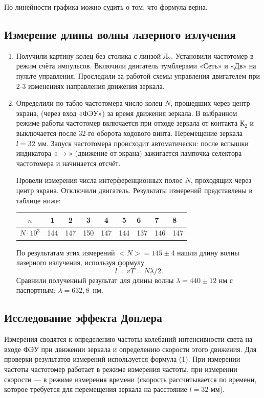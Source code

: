 \documentclass[a4paper,12pt]{article}
\begin{document}
 По линейности графика можно судить о том, что формула верна.
 \subsection*{Измерение длины волны лазерного излучения}
 \begin{enumerate}
 	\item Получили картину колец без столика с линзой Л$_2$. Установили частотомер в режим счёта импульсов. Включили двигатель тумблерами «Сеть» и «Дв» на пульте управления. Проследили за работой схемы управления двигателем при 2-3 изменениях направления движения зеркала.
 	\item Определили по табло частотомера число колец $N$, прошедших через центр экрана, (через вход «ФЭУ») за время движения зеркала. В выбранном режиме работы частотомер включается при отходе зеркала от контакта К$_2$ и выключается после 32-го оборота ходового винта. Перемещение зеркала $l = 32$ мм. Запуск частотомера происходит автоматически: после вспышки индикатора «$\rightarrow$» (движение от экрана) зажигается лампочка селектора частотомера и начинается отсчёт.
 	
 	Провели измерения числа интерференционных полос $N$, проходящих через центр экрана. Отключили двигатель. Результаты измерений представлены в таблице ниже:
 	\begin{center}
 		\begin{tabular}{|c|c|c|c|c|c|l|l|l|}
 			\hline
 			$n$ & 1 & 2 & 3 & 4 & 5 & 6 & 7 & 8 \\ \hline
 			$N\cdot 10^3$ & 144 & 147 & 150 & 147 & 144 & 137 & 146 & 147 \\ \hline
 		\end{tabular}
 	\end{center}
 	
 	По результатам этих измерений $<N>=145\pm4$ нашли длину волны лазерного излучения, используя формулу 
 	\begin{equation}
 	l=vT=N\lambda/2.
 	\end{equation}
 	Сравнили полученный результат для длины волны $\lambda=440\pm12$ нм с паспортным: $\lambda = 632{,}8$~нм.
 	
 \end{enumerate}
\subsection*{Исследование эффекта Доплера}
Измерения сводятся к определению частоты колебаний интенсивности света на входе ФЭУ при движении зеркала и определению скорости этого движения. Для проверки результатов измерений используется формула (1). При измерении частоты частотомер работает в режиме измерения частоты, при измерении скорости — в режиме измерения времени (скорость рассчитывается по времени, которое требуется для перемещения зеркала на расстояние $l = 32$ мм).
\end{document}
